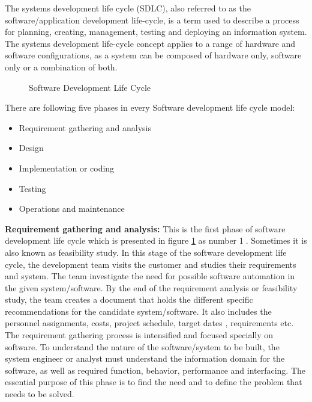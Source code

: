 The systems development life cycle (SDLC), also referred to as the software/application development life-cycle, is a term used to describe a process for planning, creating, management, testing and deploying an information system. The systems development life-cycle concept applies to a range of hardware and software configurations, as a system can be composed of hardware only, software only or a combination of both.

\begin{figure}
	\centering
	\caption{Software Development Life Cycle}
	\label{figure_sdlc}
\end{figure}

There are following five phases in every Software development life cycle model:

\begin{itemize}
	\item Requirement gathering and analysis
	\item Design
	\item Implementation or coding
	\item Testing
	\item Operations and maintenance 
\end{itemize}

\textbf{Requirement gathering and analysis:}
This is the first phase of software development life cycle which is presented in figure \ref{figure_sdlc} as number \textcircled{1}. Sometimes it is also known as feasibility study. In this stage of the software development life cycle, the development team visits the customer and studies their requirements and system. The team investigate the need for possible software automation in the given system/software. By the end of the requirement analysis or feasibility study, the team creates a document that holds the different specific recommendations for the candidate system/software. It also includes the personnel assignments, costs, project schedule, target dates , requirements etc. The requirement gathering process is intensified and focused specially on software. To understand the nature of the software/system to be built, the system engineer or analyst must understand the information domain for the software, as well as required function, behavior, performance and interfacing. The essential purpose of this phase is to find the need and to define the problem that needs to be solved.

